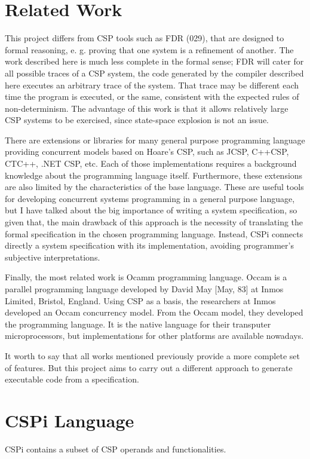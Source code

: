 \documentclass{comjnl}
\begin{document}
\section{Related Work}
This project differs from CSP tools such as FDR (029), that are designed to formal reasoning, e. g. proving that one system is a refinement of another. The work described here is much less complete in the formal sense; FDR will cater for all possible traces of a CSP system, the code generated by the compiler described here executes an arbitrary trace of the system. That
trace may be different each time the program is executed, or the same, consistent with the expected rules of non-determinism. The advantage of this work is that it allows relatively large CSP systems to be exercised, since state-space explosion is not an issue.

There are extensions or libraries for many general purpose programming language providing concurrent models based on Hoare's CSP, such as JCSP, C++CSP, CTC++, .NET CSP, etc. Each of those implementations requires a background knowledge about the programming language itself. Furthermore, these extensions are also limited by the characteristics of the base language. These are useful tools for developing concurrent systems programming in a general purpose language, but I have talked about the big importance of writing a system specification, so given that, the main drawback of this approach is the necessity of translating the formal specification in the chosen programming language. Instead, CSPi connects directly a system specification with its implementation, avoiding programmer's subjective interpretations.

Finally, the most related work is Ocamm programming language. Occam is a parallel programming language developed by David May [May, 83] at Inmos Limited, Bristol, England. Using CSP as a basis, the researchers at Inmos developed an Occam concurrency model.  From the Occam model, they developed the programming language. It is the native language for their transputer microprocessors, but implementations for other platforms are available nowadays.

It worth to say that all works mentioned previously provide a more complete set of features. But this project aims to carry out a different approach to generate executable code from a specification.

\section{CSPi Language}
CSPi contains a subset of CSP operands and functionalities. 
\end{document}

